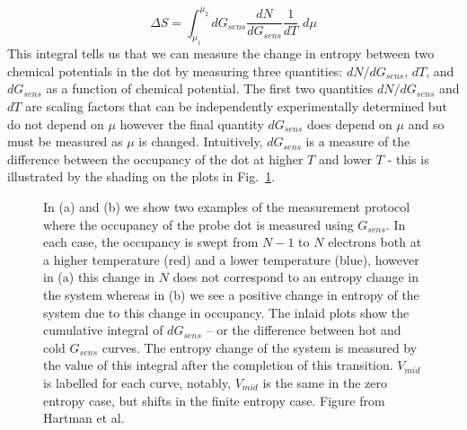 \begin{equation}
	\label{eqn:eqn2}
	\Delta S = \int_{\mu_1}^{\mu_2} d G_{sens}\frac{dN}{dG_{sens}} \frac{1}{dT} \,\,  d \mu
\end{equation}
This integral tells us that we can measure the change in entropy between two chemical potentials in the dot by measuring three quantities: $dN/dG_{sens}$, $dT$, and $dG_{sens}$ as a function of chemical potential. The first two quantities $dN/dG_{sens}$ and $dT$ are scaling factors that can be independently experimentally determined but do not depend on $\mu$ however the final quantity $dG_{sens}$ does depend on $\mu$ and so must be measured as $\mu$ is changed. Intuitively, $dG_{sens}$ is a measure of the difference between the occupancy of the dot at higher $T$ and lower $T$ - this is illustrated by the shading on the plots in Fig.~\ref{fig:num_int}. 


\begin{figure}[h]
\centering
{}
\caption{ In (a) and (b) we show two examples of the measurement protocol where the occupancy of the probe dot is measured using $G_{sens}$. In each case, the occupancy is swept from $N - 1$ to $N$ electrons both at a higher temperature (red) and a lower temperature (blue), however in (a) this change in $N$ does not correspond to an entropy change in the system whereas in (b) we see a positive change in entropy of the system due to this change in occupancy. The inlaid plots show the cumulative integral of $d G_{sens}$ -- or the difference between hot and cold $G_{sens}$ curves. The entropy change of the system is measured by the value of this integral after the completion of this transition. $V_{mid}$ is labelled for each curve, notably, $V_{mid}$ is the same in the zero entropy case, but shifts in the finite entropy case. Figure from Hartman et al.}
\label{fig:num_int}       %
\end{figure}


